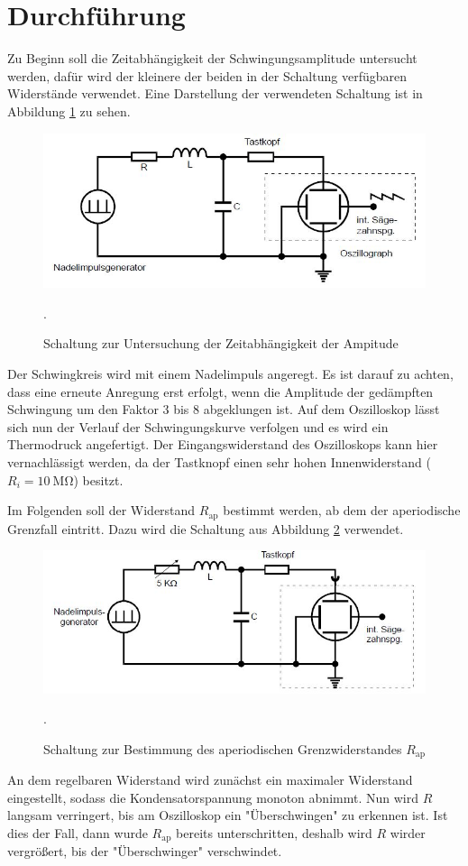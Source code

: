 \section{Durchführung}
Zu Beginn soll die Zeitabhängigkeit der Schwingungsamplitude untersucht werden, dafür
wird der kleinere der beiden in der Schaltung verfügbaren Widerstände verwendet.
Eine Darstellung der verwendeten Schaltung ist in Abbildung \ref{fig:a} zu sehen.
\begin{figure}[H]
  \centering
  \includegraphics[width=13cm]{a.JPG}
  \caption{Schaltung zur Untersuchung der Zeitabhängigkeit der Ampitude}
  \cite{skript}.
  \label{fig:a}
\end{figure}
Der Schwingkreis wird mit einem Nadelimpuls angeregt. Es ist darauf zu achten, dass
eine erneute Anregung erst erfolgt, wenn die Amplitude der gedämpften
Schwingung um den Faktor 3 bis 8 abgeklungen ist. Auf dem Oszilloskop lässt
sich nun der Verlauf der Schwingungskurve verfolgen und es wird ein
Thermodruck angefertigt.
Der Eingangswiderstand des Oszilloskops kann hier vernachlässigt werden, da der
Tastknopf einen sehr hohen Innenwiderstand ($R_{i}=\SI{10}{\mega\ohm}$) besitzt.

Im Folgenden soll der Widerstand $R_{\text{ap}}$ bestimmt werden, ab dem der aperiodische
Grenzfall eintritt. Dazu wird die Schaltung aus Abbildung \ref{fig:b} verwendet.
\begin{figure}[H]
  \centering
  \includegraphics[width=13cm]{b.JPG}
  \caption{Schaltung zur Bestimmung des aperiodischen Grenzwiderstandes $R_{\text{ap}}$}
  \cite{skript}.
  \label{fig:b}
\end{figure}
An dem regelbaren Widerstand wird zunächst ein maximaler Widerstand eingestellt, sodass
die Kondensatorspannung monoton abnimmt. Nun wird $R$ langsam verringert, bis
am Oszilloskop ein "Überschwingen" zu erkennen ist. Ist dies der Fall, dann wurde
$R_{\text{ap}}$ bereits unterschritten, deshalb wird $R$ wirder vergrößert, bis der
"Überschwinger" verschwindet.

